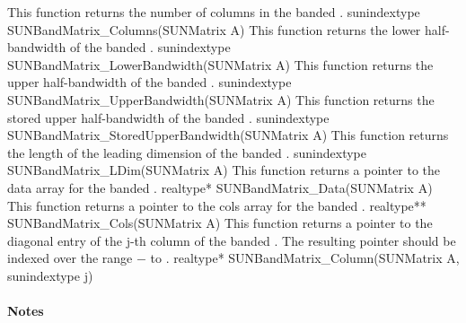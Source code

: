 {
  This function returns the number of columns in the banded .
}
{
  sunindextype SUNBandMatrix\_Columns(SUNMatrix A)
}
{
  This function returns the lower half-bandwidth of the banded .
}
{
  sunindextype SUNBandMatrix\_LowerBandwidth(SUNMatrix A)
}
{
  This function returns the upper half-bandwidth of the banded .
}
{
  sunindextype SUNBandMatrix\_UpperBandwidth(SUNMatrix A)
}
{
  This function returns the stored upper half-bandwidth of the banded .
}
{
  sunindextype SUNBandMatrix\_StoredUpperBandwidth(SUNMatrix A)
}
{
  This function returns the length of the leading dimension of the banded .
}
{
  sunindextype SUNBandMatrix\_LDim(SUNMatrix A)
}
{
  This function returns a pointer to the data array for the banded .
}
{
  realtype* SUNBandMatrix\_Data(SUNMatrix A)
}
{
  This function returns a pointer to the cols array for the banded .
}
{
  realtype** SUNBandMatrix\_Cols(SUNMatrix A)
}
{
  This function returns a pointer to the diagonal entry of the j-th
  column of the banded .  The resulting pointer should
  be indexed over the range $-$ to .
}
{
  realtype* SUNBandMatrix\_Column(SUNMatrix A, sunindextype j)
}
\paragraph{\bf Notes}

